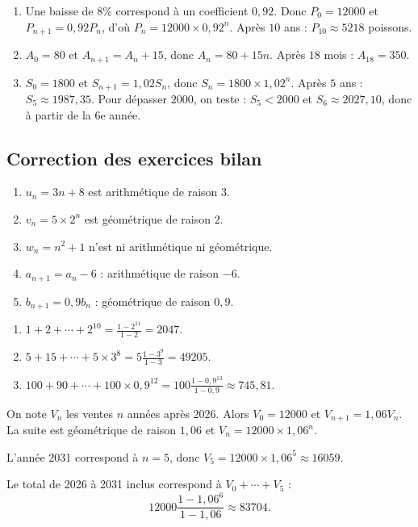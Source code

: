 \documentclass[11pt,a4paper]{article}
\begin{document}
\begin{correctionbox}
\begin{enumerate}
  \item Une baisse de $8\%$ correspond à un coefficient $0{,}92$. Donc $P_0=12000$ et $P_{n+1}=0{,}92P_n$, d'où $P_n=12000\times0{,}92^n$. Après $10$ ans : $P_{10}\approx5218$ poissons.
  \item $A_0=80$ et $A_{n+1}=A_n+15$, donc $A_n=80+15n$. Après $18$ mois : $A_{18}=350$.
  \item $S_0=1800$ et $S_{n+1}=1{,}02S_n$, donc $S_n=1800\times1{,}02^n$. Après $5$ ans : $S_5\approx1987{,}35$. Pour dépasser $2000$, on teste : $S_5<2000$ et $S_6\approx2027{,}10$, donc à partir de la 6e année.
\end{enumerate}
\end{correctionbox}

\subsection*{Correction des exercices bilan}

\begin{correctionbox}[Bilan 1]
\begin{enumerate}
  \item $u_n=3n+8$ est arithmétique de raison $3$.
  \item $v_n=5\times2^n$ est géométrique de raison $2$.
  \item $w_n=n^2+1$ n'est ni arithmétique ni géométrique.
  \item $a_{n+1}=a_n-6$ : arithmétique de raison $-6$.
  \item $b_{n+1}=0{,}9b_n$ : géométrique de raison $0{,}9$.
\end{enumerate}
\end{correctionbox}

\begin{correctionbox}[Bilan 2]
\begin{enumerate}
  \item $1+2+\cdots+2^{10}=\frac{1-2^{11}}{1-2}=2047$.
  \item $5+15+\cdots+5\times3^8=5\frac{1-3^9}{1-3}=49205$.
  \item $100+90+\cdots+100\times0{,}9^{12}=100\frac{1-0{,}9^{13}}{1-0{,}9}\approx745{,}81$.
\end{enumerate}
\end{correctionbox}

\begin{correctionbox}[Bilan 3]
On note $V_n$ les ventes $n$ années après 2026. Alors $V_0=12000$ et $V_{n+1}=1{,}06V_n$. La suite est géométrique de raison $1{,}06$ et $V_n=12000\times1{,}06^n$.

L'année 2031 correspond à $n=5$, donc $V_5=12000\times1{,}06^5\approx16059$.

Le total de 2026 à 2031 inclus correspond à $V_0+\cdots+V_5$ :
\[
12000\frac{1-1{,}06^6}{1-1{,}06}\approx83704.
\]
\end{correctionbox}
\end{document}
